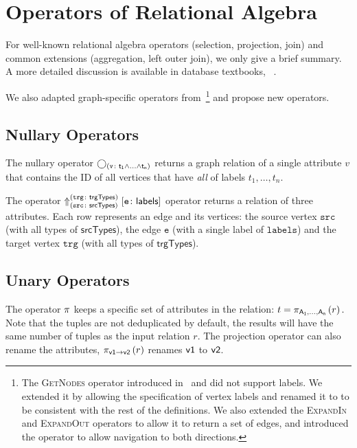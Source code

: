 \section{Operators of Relational Algebra}

For well-known relational algebra operators (\eg selection, projection, join) and common extensions (\eg aggregation, left outer join), we only give a brief summary. A more detailed discussion is available in database textbooks, \eg~\cite{DBLP:books/daglib/0020812, DBLP:books/daglib/0006733}.

We also adapted graph-specific operators from~\cite{DBLP:conf/edbt/HolschG16}\footnote{The \textsc{GetNodes} operator introduced in~\cite{DBLP:conf/edbt/HolschG16} and did not support labels. We extended it by allowing the specification of vertex labels and renamed it to \getverticestext to be consistent with the rest of the definitions. We also extended the \textsc{ExpandIn} and \textsc{ExpandOut} operators to allow it to return a set of edges, and introduced the \expandbothtext operator to allow navigation to both directions.} and propose new operators.

\subsection{Nullary Operators}
\label{sec:nullary-operators}

The \getverticestext nullary operator $\getvertices{v}{t_1 \land \ldots \land t_n}$ returns a graph relation of a single attribute $v$ that contains the ID of all vertices that have \emph{all} of labels $t_1, \ldots, t_n$.

The \getedgestext operator $\getedges{src}{srcTypes}{trg}{trgTypes}{e}{labels}$ operator returns a relation of three attributes. Each row represents an edge and its vertices: the source vertex $\mathtt{src}$ (with all types of $\mathsf{srcTypes}$), the edge $\mathtt{e}$ (with a single label of $\mathtt{labels}$) and the target vertex $\mathtt{trg}$ (with all types of $\mathsf{trgTypes}$).

\subsection{Unary Operators}
\label{sec:unary-operators}

The \projectiontext operator $\pi$ keeps a specific set of attributes in the relation: $ t = \pi_{\mathsf{A_1, \ldots, A_n}} \left(r\right).$ Note that the tuples are not deduplicated by default, \ie the results will have the same number of tuples as the input relation $r$. The projection operator can also rename the attributes, \eg $\pi_{\mathsf{v1 \rightarrow v2}} \left(r\right)$ renames $\mathsf{v1}$ to $\mathsf{v2}$.

